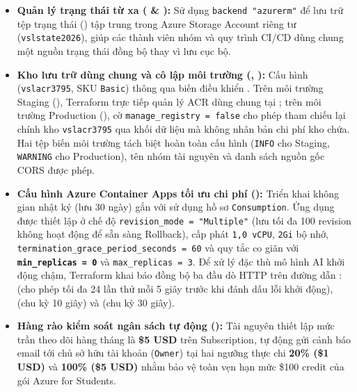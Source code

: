 \begin{itemize}
    \item \textbf{Quản lý trạng thái từ xa ( \& ):} Sử dụng \texttt{backend "azurerm"} để lưu trữ tệp trạng thái () tập trung trong Azure Storage Account riêng tư (\texttt{vslstate2026}), giúp các thành viên nhóm và quy trình CI/CD dùng chung một nguồn trạng thái đồng bộ thay vì lưu cục bộ.
    \item \textbf{Kho lưu trữ dùng chung và cô lập môi trường (, ):} Cấu hình  (\texttt{vslacr3795}, SKU \texttt{Basic}) thông qua biến điều khiển . Trên môi trường Staging (), Terraform trực tiếp quản lý ACR dùng chung tại ; trên môi trường Production (), cờ \texttt{manage\_registry = false} cho phép tham chiếu lại chính kho \texttt{vslacr3795} qua khối dữ liệu  mà không nhân bản chi phí kho chứa. Hai tệp biến môi trường tách biệt hoàn toàn cấu hình  (\texttt{INFO} cho Staging, \texttt{WARNING} cho Production), tên nhóm tài nguyên và danh sách nguồn gốc CORS được phép.
    \item \textbf{Cấu hình Azure Container Apps tối ưu chi phí ():} Triển khai không gian nhật ký  (lưu 30 ngày) gắn với  sử dụng hồ sơ \texttt{Consumption}. Ứng dụng  được thiết lập ở chế độ \texttt{revision\_mode = "Multiple"} (lưu tối đa 100 revision không hoạt động để sẵn sàng Rollback), cấp phát \texttt{1,0 vCPU}, \texttt{2Gi} bộ nhớ, \texttt{termination\_grace\_period\_seconds = 60} và quy tắc co giãn  với \textbf{\texttt{min\_replicas = 0}} và \texttt{max\_replicas = 3}. Để xử lý đặc thù mô hình AI khởi động chậm, Terraform khai báo đồng bộ ba đầu dò HTTP trên đường dẫn :  (cho phép tối đa 24 lần thử mỗi 5 giây trước khi đánh dấu lỗi khởi động),  (chu kỳ 10 giây) và  (chu kỳ 30 giây).
    \item \textbf{Hàng rào kiểm soát ngân sách tự động ():} Tài nguyên  thiết lập mức trần theo dõi hàng tháng là \textbf{\$5 USD} trên Subscription, tự động gửi cảnh báo email tới chủ sở hữu tài khoản (\texttt{Owner}) tại hai ngưỡng thực chi \textbf{20\% (\$1 USD)} và \textbf{100\% (\$5 USD)} nhằm bảo vệ toàn vẹn hạn mức \$100 credit của gói Azure for Students.
\end{itemize}

